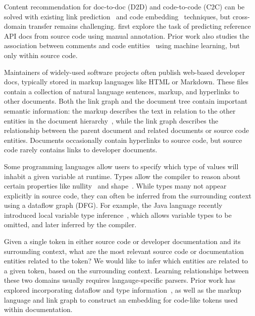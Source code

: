 \documentclass{article}
\begin{document}
Content recommendation for doc-to-doc (D2D) and code-to-code (C2C) can be solved with existing link prediction~\citep{zhang2018link} and code embedding~\citep{gu2018deep} techniques, but cross-domain transfer remains challenging. \citet{robillard2015recommending, robillard2017demand} first explore the task of predicting reference API docs from source code using manual annotation. Prior work also studies the association between comments and code entities~\citep{iyer2018mappingp, anthaplackel2020associating} using machine learning, but only within source code.

Maintainers of widely-used software projects often publish web-based developer docs, typically stored in markup languages like HTML or Markdown. These files contain a collection of natural language sentences, markup, and hyperlinks to other documents. Both the link graph and the document tree contain important semantic information: the markup describes the text in relation to the other entities in the document hierarchy~\citep{yang2016hierarchical}, while the link graph describes the relationship between the parent document and related documents or source code entities. Documents occasionally contain hyperlinks to source code, but source code rarely contains links to developer documents.

Some programming languages allow users to specify which type of values will inhabit a given variable at runtime. Types allow the compiler to reason about certain properties like nullity~\citep{ekman2007pluggable} and shape~\citep{considine2019kotlingrad}. While types many not appear explicitly in source code, they can often be inferred from the surrounding context using a dataflow graph (DFG). For example, the Java language recently introduced local variable type inference~\citet{liddell2019analyzing}, which allows variable types to be omitted, and later inferred by the compiler.

Given a single token in either source code or developer documentation and its surrounding context, what are the most relevant source code or documentation entities related to the token? We would like to infer which entities are related to a given token, based on the surrounding context. Learning relationships between these two domains usually requires langauge-specific parsers. Prior work has explored incorporating dataflow and type information~\citet{si2018learning, gu2018deep, liu2019neural}, as well as the markup language and link graph\citet{yang2016hierarchical, zhang2018link} to construct an embedding for code-like tokens used within documentation.
\end{document}
